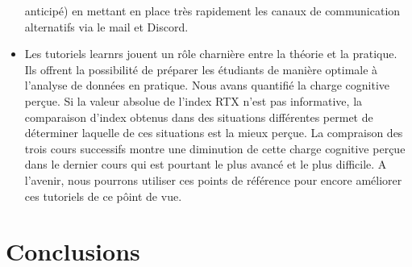 \documentclass[
]{article}
\begin{document}
\begin{itemize}
  anticipé) en mettant en place très rapidement les canaux de
  communication alternatifs via le mail et Discord.
\item
  Les tutoriels learnrs jouent un rôle charnière entre la théorie et la
  pratique. Ils offrent la possibilité de préparer les étudiants de
  manière optimale à l'analyse de données en pratique. Nous avans
  quantifié la charge cognitive perçue. Si la valeur absolue de l'index
  RTX n'est pas informative, la comparaison d'index obtenus dans des
  situations différentes permet de déterminer laquelle de ces situations
  est la mieux perçue. La compraison des trois cours successifs montre
  une diminution de cette charge cognitive perçue dans le dernier cours
  qui est pourtant le plus avancé et le plus difficile. A l'avenir, nous
  pourrons utiliser ces points de référence pour encore améliorer ces
  tutoriels de ce pôint de vue.
\end{itemize}

\hypertarget{conclusions}{%
\section{Conclusions}\label{conclusions}}
\end{document}
